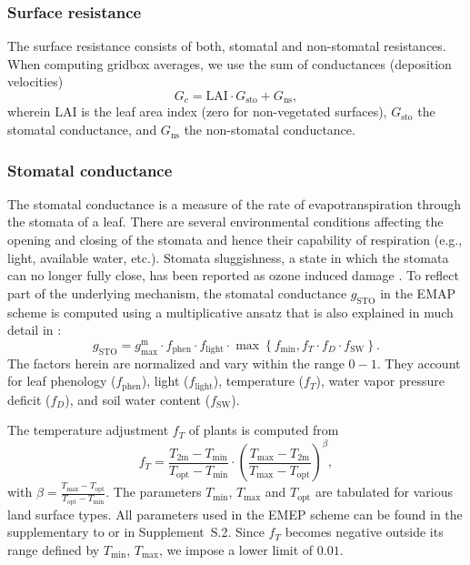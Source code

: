 \documentclass[gmd, manuscript]{copernicus}
\begin{document}
\subsubsection{Surface resistance}
\label{subsubsec:Rc}
The surface resistance consists of both, stomatal and non-stomatal resistances. When computing gridbox averages, we use the sum of conductances (deposition velocities)
\begin{equation}
  G_c = \text{LAI} \cdot G_\text{sto} + G_\text{ns}, 
\end{equation}
wherein $\text{LAI}$ is the leaf area index (zero for non-vegetated surfaces), $G_\text{sto}$ the stomatal conductance, and $G_\text{ns}$ the non-stomatal conductance.

\subsubsection*{Stomatal conductance}
The stomatal conductance is a measure of the rate of  evapotranspiration through the stomata of a leaf. There are several environmental conditions affecting the opening and closing of the stomata and hence their capability of respiration (e.g., light, available water, etc.). Stomata sluggishness, a state in which the stomata can no longer fully close, has been reported as ozone induced damage \citep{SR:Hoshika2015}. To reflect part of the underlying mechanism, the stomatal conductance $g_\text{STO}$ in the EMAP scheme is computed using a multiplicative ansatz that is also explained in much detail in \citet{ICP:MappingManual2017}:
%
\begin{equation}
  g_\text{STO} = g^\text{m}_\text{max} \cdot f_\text{phen} \cdot f_\text{light} \cdot \max{\left\{f_\text{min}, f_T \cdot f_D \cdot f_\text{SW}\right\}}.
  \label{eq:stomatal}
\end{equation}
%
The factors herein are normalized and vary within the range $0-1$. They account for leaf phenology ($f_\text{phen}$), light ($f_\text{light}$), temperature ($f_T$), water vapor pressure deficit ($f_D$), and soil water content ($f_\text{SW}$).

The temperature adjustment $f_T$ of plants is computed from
%
\begin{equation}
  f_T = \frac{T_\text{2m}-T_\text{min}}{T_\text{opt}-T_\text{min}} \cdot \left(\frac{T_{\text{max}}-T_\text{2m}}{T_{\text{max}}-T_\text{opt}}\right)^\beta, 
\end{equation}
with $\beta = \frac{T_\text{max}-T_\text{opt}}{T_\text{opt}-T_\text{min}}$. The parameters $T_\text{min}$, $T_\text{max}$ and $T_\text{opt}$ are tabulated for various land surface types. All parameters used in the EMEP scheme can be found in the supplementary to \citet{ACP:Simpson2012} or in Supplement~S.2. Since $f_T$ becomes negative outside its range defined by $T_\text{min}$, $T_\text{max}$, we impose a lower limit of $0.01$.
\end{document}
